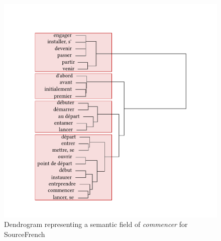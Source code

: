 \begin{figure}
\includegraphics[width=\textwidth]{figures/tree91.pdf}
\caption{\label{fig:4:88}  Dendrogram representing a semantic field of \textit{commencer} for SourceFrench}
\end{figure}

